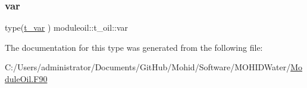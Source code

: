 \mbox{\label{structmoduleoil_1_1t__oil_adbc3fbee7764cbd713e01c02fd831351}} 
\subsubsection{\texorpdfstring{var}{var}}
{\footnotesize\ttfamily type(\mbox{\hyperlink{structmoduleoil_1_1t__var}{t\+\_\+var}} ) moduleoil\+::t\+\_\+oil\+::var\hspace{0.3cm}{\ttfamily [private]}}



The documentation for this type was generated from the following file\+:\begin{DoxyCompactItemize}
\item 
C\+:/\+Users/administrator/\+Documents/\+Git\+Hub/\+Mohid/\+Software/\+M\+O\+H\+I\+D\+Water/\mbox{\hyperlink{_module_oil_8_f90}{Module\+Oil.\+F90}}\end{DoxyCompactItemize}
